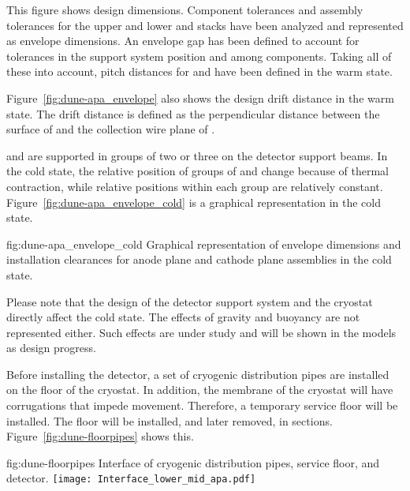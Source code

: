 This figure shows design dimensions. Component tolerances and
assembly tolerances for the upper and lower  and  stacks  have
been analyzed and represented as envelope dimensions. An envelope
gap has been defined to account for tolerances in the support
system position and among components. Taking all of these into account,
pitch distances for  and  have been defined in the warm state.


Figure~\ref{fig:dune-apa_envelope} also shows the design drift
distance in the warm state. The drift distance is defined as the
perpendicular distance between the surface of  and the collection
wire plane of .




 and  are supported in groups of
two or three on the detector support beams.  In the cold state, the
relative position of groups of  and  change because of thermal contraction, while relative positions
within each group are relatively
constant. Figure~\ref{fig:dune-apa_envelope_cold} is a graphical
representation in the cold state. 
\begin{dunefigure}{fig:dune-apa_envelope_cold} {Graphical
    representation of envelope dimensions and installation clearances
    for anode plane and cathode plane assemblies in the cold state.}
\end{dunefigure}


Please note that the design of the detector support system and
the cryostat directly affect the cold state. The
effects of gravity and buoyancy are not represented either. Such effects
are under study and will be shown in the models as design
progress.


Before installing the detector, a set of cryogenic distribution
pipes are installed on the floor of the cryostat. In addition, the
membrane of the cryostat will have corrugations that impede
movement. Therefore, a temporary service floor will be installed. The
floor will be installed, and later removed, in
sections. Figure~\ref{fig:dune-floorpipes} shows this.


\begin{dunefigure}{fig:dune-floorpipes} 
{Interface of cryogenic distribution pipes, service floor, and detector.}
  \texttt{[image: Interface\_lower\_mid\_apa.pdf]}
\end{dunefigure}




